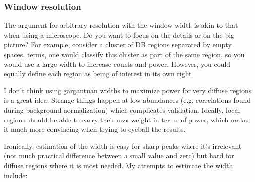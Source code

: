 \documentclass[12pt]{report}
\begin{document}
\subsubsection*{Window resolution}

The argument for arbitrary resolution with the window width is akin to that when using a microscope. 
Do you want to focus on the details or on the big picture? 
For example, consider a cluster of DB regions separated by empty spaces.
terms, one would classify this cluster as part of the same region, so you would use a large width to increase counts and power. 
However, you could equally define each region as being of interest in its own right.

I don't think using gargantuan widths to maximize power for very diffuse regions is a great idea. 
Strange things happen at low abundances (e.g. correlations found during background normalization) which complicates validation.
Ideally, local regions should be able to carry their own weight in terms of power, which makes it much more convincing when trying to eyeball the results.

Ironically, estimation of the width is easy for sharp peaks where it's irrelevant (not much practical difference between a small value and zero) but hard for diffuse regions where it is most needed.
My attempts to estimate the width include:
\end{document}
